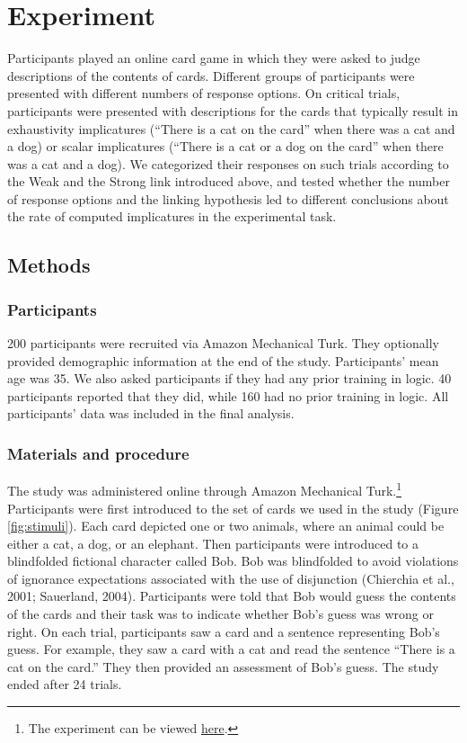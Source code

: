 \documentclass[man]{apa6}
\theoremstyle{definition}
\theoremstyle{definition}
\theoremstyle{definition}
\theoremstyle{remark}
\begin{document}
\section{Experiment}\label{experiment}

Participants played an online card game in which they were asked to
judge descriptions of the contents of cards. Different groups of
participants were presented with different numbers of response options.
On critical trials, participants were presented with descriptions for
the cards that typically result in exhaustivity implicatures
(\enquote{There is a cat on the card} when there was a cat and a dog) or
scalar implicatures (\enquote{There is a cat or a dog on the card} when
there was a cat and a dog). We categorized their responses on such
trials according to the Weak and the Strong link introduced above, and
tested whether the number of response options and the linking
hypothesis led to different conclusions about the rate of computed
implicatures in the experimental task.

\subsection{Methods}\label{methods}

\subsubsection{Participants}\label{participants}

200 participants were recruited via Amazon Mechanical Turk. They
optionally provided demographic information at the end of the study.
Participants' mean age was 35. We also asked participants if they had
any prior training in logic. 40 participants reported that they did,
while 160 had no prior training in logic. All participants' data was
included in the final analysis.

\subsubsection{Materials and procedure}\label{materials-and-procedure}

The study was administered online through Amazon Mechanical
Turk.\footnote{The experiment can be viewed
  \href{https://cdn.rawgit.com/thegricean/si-paradigms/94a590f0/experiments/main/1_methods/online_experiment/connective_game.html}{here}.}
Participants were first introduced to the set of cards we used in the
study (Figure \ref{fig:stimuli}). Each card depicted one or two animals,
where an animal could be either a cat, a dog, or an elephant. Then
participants were introduced to a blindfolded fictional character called
Bob. Bob was blindfolded to avoid violations of ignorance expectations
associated with the use of disjunction (Chierchia et al., 2001;
Sauerland, 2004). Participants were told that Bob would guess the
contents of the cards and their task was to indicate whether Bob's guess
was wrong or right. On each trial, participants saw a card and a
sentence representing Bob's guess. For example, they saw a card with a
cat and read the sentence \enquote{There is a cat on the card.} They
then provided an assessment of Bob's guess. The study ended after 24
trials.
\end{document}
